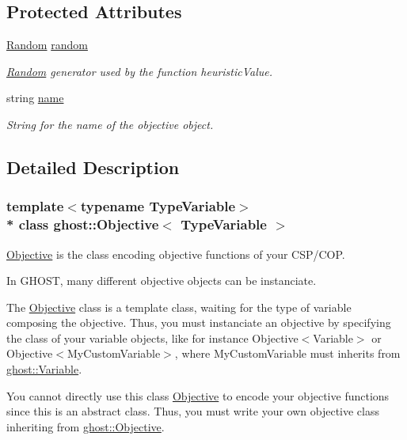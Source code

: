 \subsection*{Protected Attributes}
\begin{DoxyCompactItemize}
\item 
\hyperlink{classghost_1_1Random}{Random} \hyperlink{classghost_1_1Objective_ae4b72b2e592243707f478ec1adbef234}{random}
\begin{DoxyCompactList}\small\item\em \hyperlink{classghost_1_1Random}{Random} generator used by the function heuristic\+Value. \end{DoxyCompactList}\item 
string \hyperlink{classghost_1_1Objective_a02aee324f6958b6c533f27ec430690fe}{name}
\begin{DoxyCompactList}\small\item\em String for the name of the objective object. \end{DoxyCompactList}\end{DoxyCompactItemize}


\subsection{Detailed Description}
\subsubsection*{template$<$typename Type\+Variable$>$\\*
class ghost\+::\+Objective$<$ Type\+Variable $>$}

\hyperlink{classghost_1_1Objective}{Objective} is the class encoding objective functions of your C\+S\+P/\+C\+OP. 

In G\+H\+O\+ST, many different objective objects can be instanciate.

The \hyperlink{classghost_1_1Objective}{Objective} class is a template class, waiting for the type of variable composing the objective. Thus, you must instanciate an objective by specifying the class of your variable objects, like for instance Objective$<$\+Variable$>$ or Objective$<$\+My\+Custom\+Variable$>$, where My\+Custom\+Variable must inherits from \hyperlink{classghost_1_1Variable}{ghost\+::\+Variable}.

You cannot directly use this class \hyperlink{classghost_1_1Objective}{Objective} to encode your objective functions since this is an abstract class. Thus, you must write your own objective class inheriting from \hyperlink{classghost_1_1Objective}{ghost\+::\+Objective}.

